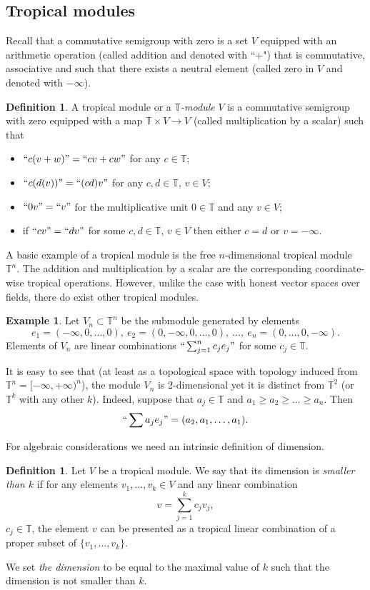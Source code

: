 \documentclass[12pt]{amsart}
\theoremstyle{plain}
\theoremstyle{definition}
\newtheorem{definition}[theorem]{Definition}
\newtheorem{example}[theorem]{Example}
\theoremstyle{remark}
\newcommand{\T}{\mathbb T}    %
\newcommand{\<}{\langle}   %
\renewcommand{\>}{\rangle} %
\begin{document}
\subsection{Tropical modules}
Recall that a commutative semigroup with zero is a set $V$ equipped with
an arithmetic operation (called addition and denoted with ``+") that is commutative,
associative and such that there exists a neutral element (called zero in $V$
and denoted with $-\infty$).
\begin{definition}
A tropical module or a {\em $\T$-module} $V$ is a commutative
semigroup with zero equipped with a map $\T\times V\to V$ (called
multiplication by a scalar) such that
\begin{itemize}
\item $``c(v+w)"=``cv+cw"$ for any $c\in\T$;
\item $``c(d(v))"=``(cd)v"$ for any $c,d\in\T$, $v\in V$;
\item $``0v"=``v"$ for the multiplicative unit $0\in\T$ and any $v\in V$;
\item if $``cv"=``dv"$ for some $c,d\in\T$, $v\in V$ then either $c=d$ or $v=-\infty$.
\end{itemize}
\end{definition}

A basic example of a tropical module is the free $n$-dimensional
tropical module $\T^n$. The addition and multiplication by a scalar
are the corresponding coordinate-wise tropical operations.
However, unlike the case with honest vector spaces over fields,
there do exist other tropical modules.

\begin{example}\label{Vn}
Let $V_n\subset\T^n$ be the submodule generated by
elements
$$e_1=(-\infty,0,\dots,0),\  e_2=(0,-\infty,0,\dots,0),\ \dots,\ e_n=(0,\dots,0,-\infty).$$
Elements of $V_n$ are linear combinations
$``\sum_{j=1}^nc_je_j"$ for some $c_j\in\T$.
\end{example}

It is easy to see that (at least as a topological space with
topology induced from $\T^n=[-\infty,+\infty)^n$), the module $V_n$
is 2-dimensional yet it is distinct from $\T^2$ (or $\T^k$ with any
other $k$). Indeed, suppose that $a_j\in\T$ and $a_1\ge a_2\ge...\ge a_n$.
Then
$$``\sum a_je_j"=(a_2,a_1,\dots,a_1).$$

For algebraic considerations we need an intrinsic definition
of dimension.
\begin{definition}\label{algdim}
Let $V$ be a tropical module. We say that its dimension is
{\em smaller than $k$} if for any elements $v_1,\dots,v_k\in V$
and any linear combination
$$v=\sum_{j=1}^k c_jv_j,$$
$c_j\in\T$, the element $v$ can be presented
as a tropical linear combination of a proper subset of
$\{v_1,\dots,v_k\}$.

We set {\em the dimension} to be equal to the maximal value of $k$
such that the dimension is not smaller than $k$.
\end{definition}
\end{document}
